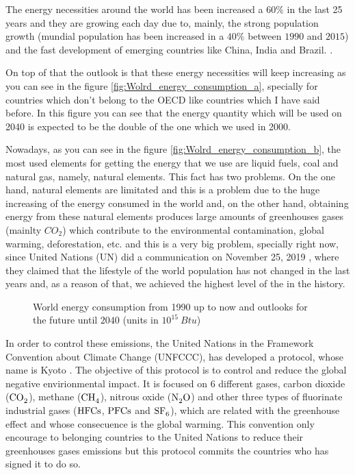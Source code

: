 The energy necessities around the world has been increased a $60\%$ in the last 25 years and they are growing each day due to, mainly, the strong population growth (mundial population has been increased in a $40\%$ between $1990$ and $2015$) and the fast development of emerging countries like China, India and Brazil. \cite{Renovables}. 

On top of that the outlook is that these energy necessities will keep increasing as you can see in the figure \ref{fig:Wolrd_energy_consumption_a}, specially for countries which don't belong to the OECD like countries which I have said before. In this figure you can see that the energy quantity which will be used on 2040 is expected to be the double of the one which we used in 2000. 

Nowadays, as you can see in the figure \ref{fig:Wolrd_energy_consumption_b}, the most used elements for getting the energy that we use are liquid fuels, coal and natural gas, namely, natural elements. This fact has two problems. On the one hand, natural elements are limitated and this is a problem due to the huge increasing of the energy consumed in the world and, on the other hand, obtaining energy from these natural elements produces large amounts of greenhouses gases (mainlty $CO_2$) which contribute to the environmental contamination, global warming, deforestation, etc. and this is a very big problem, specially right now, since United Nations (UN) did a communication on November 25, 2019 \cite{HighestCO2}, where they claimed that the lifestyle of the world population has not changed in the last years and, as a reason of that, we achieved the highest level of the  in the history.

\begin{figure}[]
 \centering
 \caption{World energy consumption from 1990 up to now and outlooks for the future until $2040$ (units in $10^{15}~Btu$) \cite{EIA}}
 \label{fig:Wolrd_energy_consumption} 
\end{figure}

In order to control these emissions, the United Nations in the Framework Convention about Climate Change (UNFCCC), has developed a protocol, whose name is Kyoto \cite{Kyoto}. The objective of this protocol is to control and reduce the global negative envirionmental impact. It is focused on 6 different gases, carbon dioxide ($\ce{CO_2}$), methane ($\ce{CH_4}$), nitrous oxide ($\ce{N_2 O}$) and other three types of fluorinate industrial gases ($\ce{HFCs}$, $\ce{PFCs}$ and $\ce{SF6}$), which are related with the greenhouse effect and whose consecuence is the global warming. This convention only encourage to belonging countries to the United Nations to reduce their greenhouses gases emissions but this protocol commits the countries who has signed it to do so.

